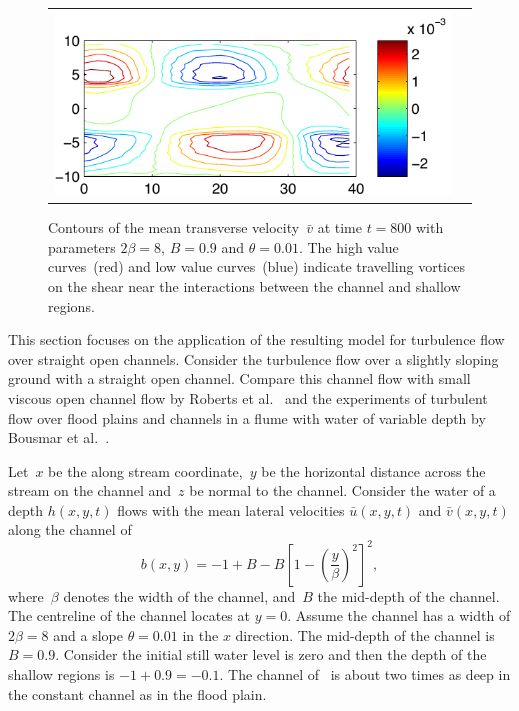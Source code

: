 \documentclass[twocolumn]{afmc_art}
\newcommand{\uu}{{\bar u}}
\newcommand{\vv}{{\bar v}}
\begin{document}
\begin{figure}
\centering
\begin{tabular}{c@{}c}
\includegraphics[scale=0.8]{straight-velocity-vc}
\end{tabular}
\caption{Contours of the mean transverse velocity~$\vv$ at time $t=800$ with parameters $2\beta=8$, $B=0.9$ and $\theta=0.01$. 
The high value curves~(red) and low value curves~(blue) indicate travelling vortices on the shear near the interactions between the channel and shallow regions. }
\label{straight-velocity-vc}
\end{figure}%

This section focuses on the application of the resulting model for turbulence flow over straight open channels. 
Consider the turbulence flow over a slightly sloping ground with a straight open channel. 
Compare this channel flow with small viscous open channel flow by Roberts et al.~\cite{Robertsli2006} and the experiments of turbulent flow over flood plains and channels in a flume with water of variable depth by Bousmar et al.~\cite{Bousmar2002,Bousmar2003a}. 
 
 Let~$x$ be the along stream coordinate,~$y$ be the horizontal distance across the stream on the channel and~$z$ be normal to the channel. 
Consider the water of a depth $h(x,y,t)$ flows with the mean lateral velocities $\uu(x,y,t)$ and $\vv(x,y,t)$ along the channel of
\begin{equation}
b(x,y)=-1+B-B\left[1-\left(\frac{y}{\beta}\right)^2\right]^2,\label{bed:straight}
\end{equation}
where~$\beta$ denotes the width of the channel, and~$B$ the mid-depth of the channel.  
The centreline of the channel locates at $y=0$.
Assume the channel has a width of  $2\beta=8$ and a slope $\theta=0.01$ in the $x$ direction.  
The mid-depth of the channel is $B=0.9$.
Consider the initial still water level is zero and then the depth of the shallow regions is $-1+0.9=-0.1$.
The channel of~\cite{Bousmar2002} is about two times as deep in the constant channel as in the flood plain.
\end{document}
